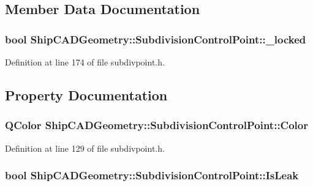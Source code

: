 \subsection{Member Data Documentation}
\hypertarget{classShipCADGeometry_1_1SubdivisionControlPoint_a65710e5c15163d01dcfdb562abb23103}{
\subsubsection[{\-\_\-locked}]{\setlength{\rightskip}{0pt plus 5cm}bool Ship\-C\-A\-D\-Geometry\-::\-Subdivision\-Control\-Point\-::\-\_\-locked\hspace{0.3cm}{\ttfamily [protected]}}}\label{classShipCADGeometry_1_1SubdivisionControlPoint_a65710e5c15163d01dcfdb562abb23103}


Definition at line 174 of file subdivpoint.\-h.



\subsection{Property Documentation}
\hypertarget{classShipCADGeometry_1_1SubdivisionControlPoint_aecfab9d47ea8e16714ce095e3e055e55}{
\subsubsection[{Color}]{\setlength{\rightskip}{0pt plus 5cm}Q\-Color Ship\-C\-A\-D\-Geometry\-::\-Subdivision\-Control\-Point\-::\-Color\hspace{0.3cm}{\ttfamily [read]}}}\label{classShipCADGeometry_1_1SubdivisionControlPoint_aecfab9d47ea8e16714ce095e3e055e55}


Definition at line 129 of file subdivpoint.\-h.

\hypertarget{classShipCADGeometry_1_1SubdivisionControlPoint_a722a0531b6f27404b82850de2305dbea}{
\subsubsection[{Is\-Leak}]{\setlength{\rightskip}{0pt plus 5cm}bool Ship\-C\-A\-D\-Geometry\-::\-Subdivision\-Control\-Point\-::\-Is\-Leak\hspace{0.3cm}{\ttfamily [read]}}}\label{classShipCADGeometry_1_1SubdivisionControlPoint_a722a0531b6f27404b82850de2305dbea}


